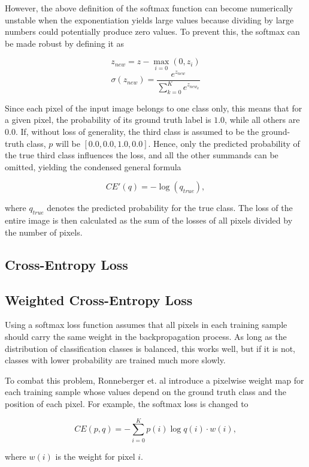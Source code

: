 However, the above definition of the softmax function can become numerically unstable when the exponentiation yields large values because dividing by large numbers could potentially produce zero values. To prevent this, the softmax can be made robust by defining it as

\[z_{new} = z - \max \limits_{i = 0}(0, z_i)\]
\[\sigma(z_{new}) = \frac{e^{z_{new}}}{\sum \limits_{k=0}^{K} e^{z_{new_{k}}}}\]

\noindent Since each pixel of the input image belongs to one class only, this means that for a given pixel, the probability of its ground truth label is $1.0$, while all others are $0.0$. If, without loss of generality, the third class is assumed to be the ground-truth class, $p$ will be $[0.0, 0.0, 1.0, 0.0]$.  Hence, only the predicted probability of the true third class influences the loss, and all the other summands can be omitted, yielding the condensed general formula

\[CE'(q) = - \log(q_{true}),\]

\noindent where $q_{true}$ denotes the predicted probability for the true class. The loss of the entire image is then calculated as the sum of the losses of all pixels divided by the number of pixels.

		\subsection{Cross-Entropy Loss}

		\subsection{Weighted Cross-Entropy Loss}

Using a softmax loss function assumes that all pixels in each training sample should carry the same weight in the backpropagation process. As long as the distribution of classification classes is balanced, this works well, but if it is not, classes with lower probability are trained much more slowly.

To combat this problem, Ronneberger et. al\cite{unet} introduce a pixelwise weight map for each training sample whose values depend on the ground truth class and the position of each pixel. For example, the softmax loss is changed to

\[CE(p, q) = -\sum \limits_{i = 0}^{K} p(i) \log q(i) \cdot w(i),\]

\noindent where $w(i)$ is the weight for pixel $i$.

